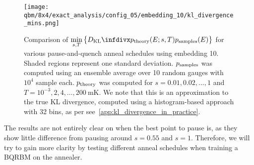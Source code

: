 \begin{figure}[!htb]
    \begin{center}
        \texttt{[image: qbm/8x4/exact\_analysis/config\_05/embedding\_10/kl\_divergence\_mins.png]}
    \end{center}
    \caption{
        Comparison of \( \min\limits_{s,T}\big\{\DKL{\ptheory(E;s,T)}{\psamples(E)}\big\} \) for various pause-and-quench anneal schedules using embedding 10.
        Shaded regions represent one standard deviation.
        \( p_{\text{samples}} \) was computed using an ensemble average over 10 random gauges with \( 10^4 \) sample each.
        \( p_{\text{theory}} \) was computed for \( s = 0.01, 0.02, \dots, 1 \) and \( T = 10^{-3}, 2, 4, \dots, 200 \ \si{\milli\kelvin} \).
        We note that this is an approximation to the true KL divergence, computed using a histogram-based approach with 32 bins, as per see~\cref{app:kl_divergence_in_practice}.
    }
    \label{fig:dkl_mins_embedding_05}
\end{figure}

The results are not entirely clear on when the best point to pause is, as they show little difference from pausing around \( s = 0.55 \) and \( s = 1 \).
Therefore, we will try to gain more clarity by testing different anneal schedules when training a BQRBM on the annealer.


